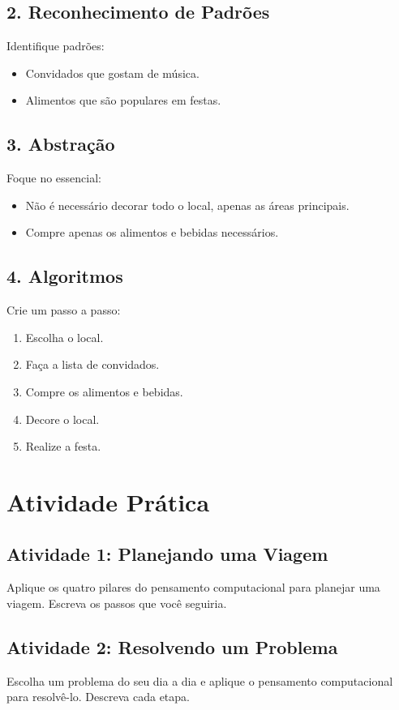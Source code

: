 \documentclass[12pt]{article}
\begin{document}
\begin{multicols}{2}
\subsection*{2. Reconhecimento de Padrões}
Identifique padrões:
\begin{itemize}
    \item Convidados que gostam de música.
    \item Alimentos que são populares em festas.
\end{itemize}

\subsection*{3. Abstração}
Foque no essencial:
\begin{itemize}
    \item Não é necessário decorar todo o local, apenas as áreas principais.
    \item Compre apenas os alimentos e bebidas necessários.
\end{itemize}

\subsection*{4. Algoritmos}
Crie um passo a passo:
\begin{enumerate}
    \item Escolha o local.
    \item Faça a lista de convidados.
    \item Compre os alimentos e bebidas.
    \item Decore o local.
    \item Realize a festa.
\end{enumerate}

\section*{Atividade Prática}

\subsection*{Atividade 1: Planejando uma Viagem}
Aplique os quatro pilares do pensamento computacional para planejar uma viagem. Escreva os passos que você seguiria.

\subsection*{Atividade 2: Resolvendo um Problema}
Escolha um problema do seu dia a dia e aplique o pensamento computacional para resolvê-lo. Descreva cada etapa.

\end{multicols}
\end{document}

